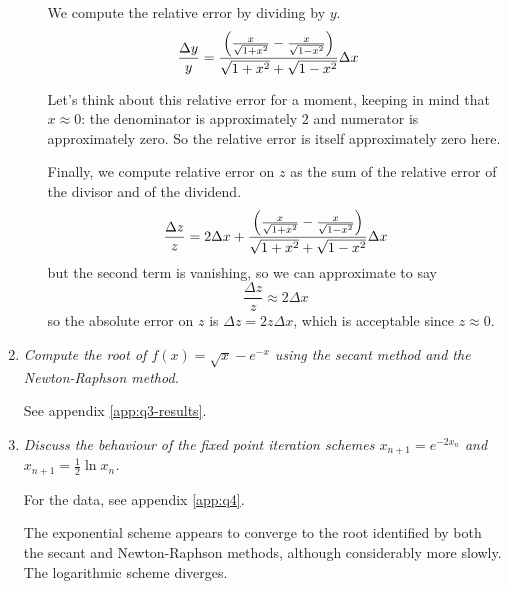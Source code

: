 \documentclass[11pt,letterpaper]{article}
\begin{document}
\begin{enumerate}
\begin{enumerate}
        We compute the relative error by dividing by $y$.
        \begin{align*}
          \frac{\Delta y}{y}
          &= \frac{
            \left(\frac{x}{\sqrt{1 + x^2}} - \frac{x}{\sqrt{1 - x^2}}\right)
          }{
            \sqrt{1 + x^2} + \sqrt{1 - x^2}
          }
          \Delta x
        \end{align*}

        Let's think about this relative error for a moment, keeping in mind
        that $x \approx 0$:
        the denominator is approximately $2$ and numerator is approximately
        zero.
        So the relative error is itself approximately zero here.

        Finally, we compute relative error on $z$ as the sum of the relative
        error of the divisor and of the dividend.
        \begin{equation*}
          \frac{\Delta z}{z}
          =
          2 \Delta x
          +
          \frac{
            \left(\frac{x}{\sqrt{1 + x^2}} - \frac{x}{\sqrt{1 - x^2}}\right)
          }{
            \sqrt{1 + x^2} + \sqrt{1 - x^2}
          }
          \Delta x
        \end{equation*}
        but the second term is vanishing, so we can approximate to say
        \begin{equation*}
          \frac{\Delta z}{z}
          \approx 2\Delta x
        \end{equation*}
        so the absolute error on $z$ is $\Delta z = 2 z \Delta x$, which is
        acceptable since $z \approx 0$.
    \end{enumerate}

  \item
    \emph{%
      Compute the root of $f(x) = \sqrt{x} - e^{-x}$ using the secant method
      and the Newton-Raphson method.%
    }

    See appendix \ref{app:q3-results}.

  \item
    \emph{%
      Discuss the behaviour of the fixed point iteration schemes
      $x_{n+1} = e^{-2x_n}$ and
      $x_{n+1} = \frac{1}{2} \ln x_n$.
    }

    For the data, see appendix \ref{app:q4}.

    The exponential scheme appears to converge to the root identified by both
    the secant and Newton-Raphson methods, although considerably more slowly.
    The logarithmic scheme diverges.


\end{enumerate}
\end{document}
